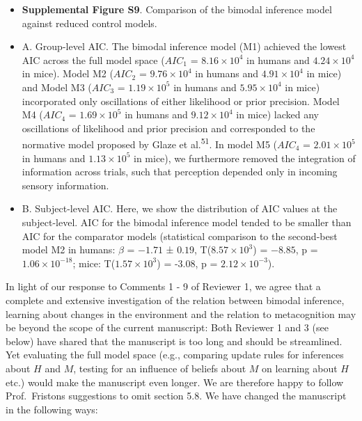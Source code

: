 \documentclass[
]{article}
\begin{document}
\begin{itemize}
\item
  \textbf{Supplemental Figure S9}. Comparison of the bimodal inference
  model against reduced control models.
\item
  A. Group-level AIC. The bimodal inference model (M1) achieved the
  lowest AIC across the full model space (\(AIC_1\) =
  \ensuremath{8.16\times 10^{4}} in humans and
  \ensuremath{4.24\times 10^{4}} in mice). Model M2 (\(AIC_2\) =
  \(\ensuremath{9.76\times 10^{4}}\) in humans and
  \(\ensuremath{4.91\times 10^{4}}\) in mice) and Model M3 (\(AIC_3\) =
  \(\ensuremath{1.19\times 10^{5}}\) in humans and
  \(\ensuremath{5.95\times 10^{4}}\) in mice) incorporated only
  oscillations of either likelihood or prior precision. Model M4
  (\(AIC_4\) = \(\ensuremath{1.69\times 10^{5}}\) in humans and
  \(\ensuremath{9.12\times 10^{4}}\) in mice) lacked any oscillations of
  likelihood and prior precision and corresponded to the normative model
  proposed by Glaze et al.\textsuperscript{51}. In model M5 (\(AIC_4\) =
  \(\ensuremath{2.01\times 10^{5}}\) in humans and
  \(\ensuremath{1.13\times 10^{5}}\) in mice), we furthermore removed
  the integration of information across trials, such that perception
  depended only in incoming sensory information.
\item
  B. Subject-level AIC. Here, we show the distribution of AIC values at
  the subject-level. AIC for the bimodal inference model tended to be
  smaller than AIC for the comparator models (statistical comparison to
  the second-best model M2 in humans: \(\beta\) = \(-1.71\) ± \(0.19\),
  T(\(\ensuremath{8.57\times 10^{3}}\)) = \(-8.85\), p =
  \(\ensuremath{1.06\times 10^{-18}}\); mice:
  T(\ensuremath{1.57\times 10^{3}}) = -3.08, p =
  \(\ensuremath{2.12\times 10^{-3}}\)).
\end{itemize}

In light of our response to Comments 1 - 9 of Reviewer 1, we agree that
a complete and extensive investigation of the relation between bimodal
inference, learning about changes in the environment and the relation to
metacognition may be beyond the scope of the current manuscript: Both
Reviewer 1 and 3 (see below) have shared that the manuscript is too long
and should be streamlined. Yet evaluating the full model space (e.g.,
comparing update rules for inferences about \(H\) and \(M\), testing for
an influence of beliefs about \(M\) on learning about \(H\) etc.) would
make the manuscript even longer. We are therefore happy to follow
Prof.~Fristons suggestions to omit section 5.8. We have changed the
manuscript in the following ways:
\end{document}
